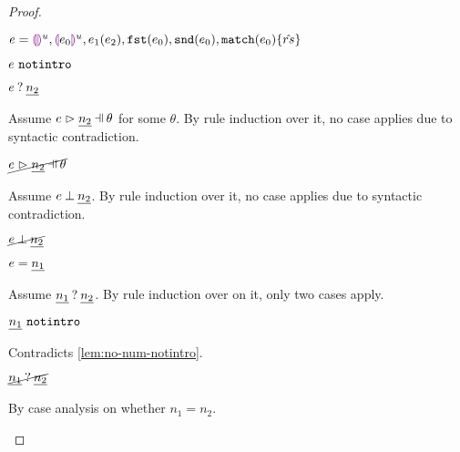 \begin{proof}
\begin{byCases}
\begin{byCases}
        \begin{pfsteps*}
        \item $e=\textcolor{violet}{\llparenthesis}\textcolor{violet}{\rrparenthesis}^{u},\textcolor{violet}{\llparenthesis} e_0\textcolor{violet}{\rrparenthesis}^{u},e_1(e_2),\mathtt{fst}(e_0),\mathtt{snd}(e_0),\mathtt{match}(e_0) \{\hat{rs}\}$ 
        \item $e ~\mathtt{notintro}$  
        \item $e \mathbin{?} \underline{n_2}$ 
        \end{pfsteps*}
        Assume $\hpatmatch{e}{\hnum{n_2}}{\theta}$ for some $\theta$. By rule induction over it, no case applies due to syntactic contradiction.
        \begin{pfsteps*}
        \item $\cancel{\hpatmatch{e}{\hnum{n_2}}{\theta}}$ 
        \end{pfsteps*}
        Assume $e \mathbin{\bot} \underline{n_2}$. By rule induction over it, no case applies due to syntactic contradiction.
        \begin{pfsteps*}
        \item $\cancel{e \mathbin{\bot} \underline{n_2}}$ 
        \end{pfsteps*}
    \item[\text{(\ref{rule:TNum})}]
        \begin{pfsteps*}
        \item $e=\underline{n_1}$
        \end{pfsteps*}
        Assume $\underline{n_1} \mathbin{?} \underline{n_2}$. By rule induction over  on it, only two cases apply.
        \begin{byCases}
        \item[\text{(\ref{rule:MMNotIntro})}]
            \begin{pfsteps*}
            \item $\underline{n_1} ~\mathtt{notintro}$ 
            \end{pfsteps*}
            Contradicts \autoref{lem:no-num-notintro}.
        \end{byCases}
        \begin{pfsteps*}
        \item $\cancel{\underline{n_1} \mathbin{?} \underline{n_2}}$ 
        \end{pfsteps*}
        By case analysis on whether $n_1=n_2$.

\end{byCases}
\end{byCases}
\end{proof}
